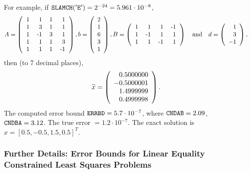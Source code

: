 \noindent
For example, if ${\tt SLAMCH('E')} = 2^{-24} = 5.961 \cdot 10^{-8}$,
$$  A = \left( \begin{tabular}{rrrr}
                  1 &  1 &  1 &  1 \\
                  1 &  3 &  1 &  1 \\
                  1 & -1 &  3 &  1 \\
                  1 &  1 &  1 &  3 \\
                  1 &  1 &  1 & -1
               \end{tabular} \right),
    b = \left( \begin{array}{r}
                   2 \\
                   1 \\
                   6 \\
                   3 \\
                   1
               \end{array} \right),
    B = \left( \begin{tabular}{rrrr}
                  1 &  1 &  1 & -1 \\
                  1 & -1 &  1 &  1\\
                  1 &  1 & -1 &  1
               \end{tabular} \right)
    \quad \mbox{and} \quad
    d = \left( \begin{array}{r}
                   1 \\
                   3 \\
                  -1
               \end{array} \right),
$$
then (to 7 decimal places),
$$  \widehat{x} = \left( \begin{array}{r}
                             0.5000000 \\
                            -0.5000001 \\
                             1.4999999 \\
                             0.4999998
                        \end{array} \right).$$
The computed error bound ${\tt ERRBD} = 5.7\cdot10^{-7}$,
where ${\tt CNDAB} = 2.09$, ${\tt CNDBA} = 3.12$.
The true error $= 1.2\cdot10^{-7}$.
The exact solution is $x = [0.5, -0.5, 1.5, 0.5]^T$.

\subsubsection{Further Details:
Error Bounds for Linear Equality Constrained Least Squares Problems}
\label{sec_lseglm_lsedetails}

